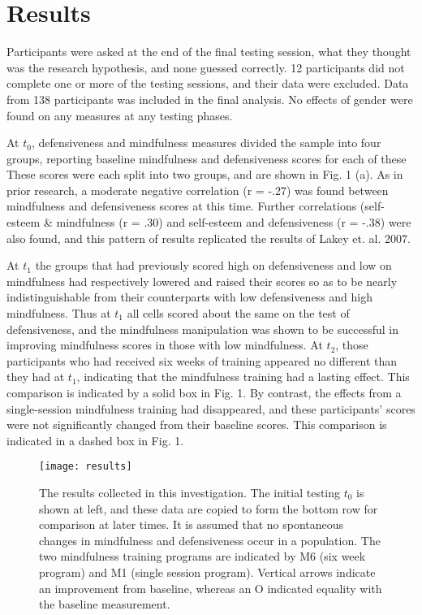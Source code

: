 \documentclass[jou]{apa}
\begin{document}
\section{Results}
Participants were asked at the end of the final testing session, what they thought was the research hypothesis, and none guessed correctly.  12 participants did not complete one or more of the testing sessions, and their data were excluded.  Data from 138 participants was included in the final analysis.  No effects of gender were found on any measures at any testing phases.  

At $t_0$, defensiveness and mindfulness measures divided the sample into four groups, reporting baseline mindfulness and defensiveness scores for each of these These scores were each split into two groups, and are shown in Fig. 1 (a).  As in prior research, a moderate negative correlation (r = -.27) was found between mindfulness and defensiveness scores at this time.  Further correlations (self-esteem \& mindfulness (r = .30) and self-esteem and defensiveness (r = -.38) were also found, and this pattern of results replicated the results of Lakey et. al. 2007.  

At $t_1$ the groups that had previously scored high on defensiveness and low on mindfulness had respectively lowered and raised their scores so as to be nearly indistinguishable from their counterparts with low defensiveness and high mindfulness.  Thus at $t_1$ all cells scored about the same on the test of defensiveness, and the mindfulness manipulation was shown to be successful in improving mindfulness scores in those with low mindfulness.  At $t_2$, those participants who had received six weeks of training appeared no different than they had at $t_1$, indicating that the mindfulness training had a lasting effect.  This comparison is indicated by a solid box in Fig. 1.  By contrast, the effects from a single-session mindfulness training had disappeared, and these participants' scores were not significantly changed from their baseline scores.  This comparison is indicated in a dashed box in Fig. 1.

\begin{figure}[h]
\centering
\texttt{[image: results]} 
\caption{The results collected in this investigation.  The initial testing $t_0$ is shown at left, and these data are copied to form the bottom row for comparison at later times.  It is assumed that no spontaneous changes in mindfulness and defensiveness occur in a population.  The two mindfulness training programs are indicated by M6 (six week program) and M1 (single session program).  Vertical arrows indicate an improvement from baseline, whereas an O indicated equality with the baseline measurement.}
\label{results}
\end{figure}
\end{document}

